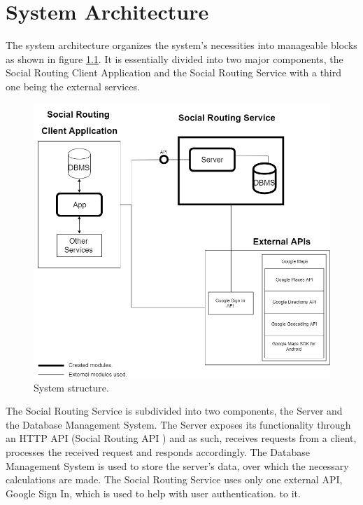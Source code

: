 \chapter{System Architecture}     
        The system architecture organizes the system's necessities into manageable blocks as shown in figure \ref{fig:systemstructure}.
        It is essentially divided into two major components, the Social Routing Client Application \cite{clientapplicationdocs} and the Social Routing Service with a third one being the external services.
        
        \vfill
        \begin{figure}[h]            
            \includegraphics[width=\textwidth]{images/project-structure/system-structure.PNG}
            \caption{System structure.}
            \label{fig:systemstructure}
        \end{figure} 

        The Social Routing Service is subdivided into two components, the Server and the Database Management System\cite{dbmsdefinition}. The Server exposes its
        functionality through an HTTP\cite{httponlinedocs} API\cite{api} (Social Routing API \cite{apidocs}) and as such, receives requests from a client, processes the received request and responds accordingly.
        The Database Management System is used to store the server's data, over which the necessary calculations are made. 
        The Social Routing Service uses only one external API, Google Sign In\cite{googlesignindocs}, which is used to help with user authentication.
        to it.

